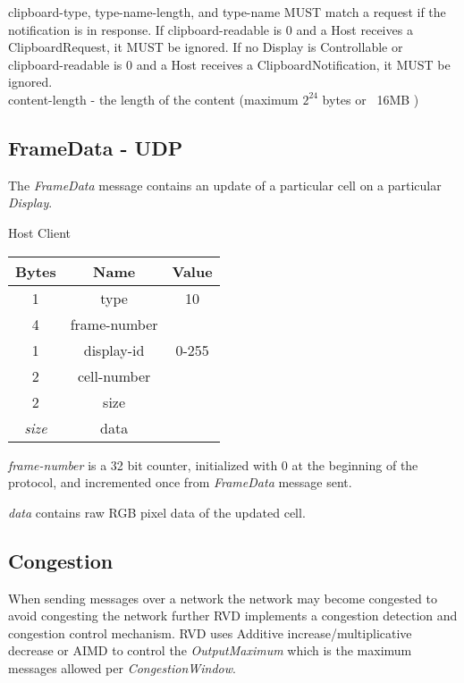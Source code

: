 clipboard-type, type-name-length, and type-name MUST match a request if the notification is in response. If
clipboard-readable is 0 and a Host receives a ClipboardRequest, it MUST be ignored. If no Display is Controllable or
clipboard-readable is 0 and a Host receives a ClipboardNotification, it MUST be ignored.\\

content-length -  the length of the content  (maximum $2^{24}$ bytes or ~16MB )\\

\subsection{FrameData - UDP}
The \emph{FrameData} message contains an update of a particular cell on a particular \emph{Display}.

\begin{center}
    Host \textrightarrow Client\\
    \begin{tabular}{|c|c|c|}
        \hline
        \textbf{Bytes} & \textbf{Name} & \textbf{Value} \\
        \hline
        1              & type          & 10             \\
        \hline
        4              & frame-number  &                \\
        \hline
        1              & display-id    & 0-255          \\
        \hline
        2              & cell-number   &                \\
        \hline
        2              & size          &                \\
        \hline
        \emph{size}    & data          &                \\
        \hline
    \end{tabular}
\end{center}

\emph{frame-number} is a 32 bit counter, initialized with 0 at the beginning of the protocol, and incremented once
from \emph{FrameData} message sent.

\emph{data} contains raw RGB pixel data of the updated cell.

\subsection{Congestion}

When sending messages over a network the network may become congested to avoid congesting the network further RVD
implements a congestion detection and congestion control mechanism. RVD uses Additive increase/multiplicative
decrease or AIMD to control the \emph{OutputMaximum} which is the maximum messages allowed per
\emph{CongestionWindow}.